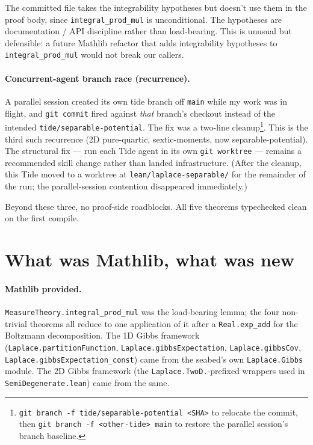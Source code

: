 \documentclass[11pt]{article}
\begin{document}
The committed file takes the integrability hypotheses but doesn't use
them in the proof body, since \texttt{integral\_prod\_mul} is
unconditional. The hypotheses are documentation / API discipline rather
than load-bearing. This is unusual but defensible: a future Mathlib
refactor that adds integrability hypotheses to \texttt{integral\_prod\_mul}
would not break our callers.

\paragraph{Concurrent-agent branch race (recurrence).}
A parallel session created its own tide branch off \texttt{main}
while my work was in flight, and \texttt{git commit} fired against
\emph{that} branch's checkout instead of the intended
\texttt{tide/separable-potential}. The fix was a two-line
cleanup\footnote{\texttt{git branch -f tide/separable-potential <SHA>}
to relocate the commit, then \texttt{git branch -f <other-tide> main}
to restore the parallel session's branch baseline.}. This is the
third such recurrence (2D pure-quartic, sextic-moments, now
separable-potential). The structural fix --- run each Tide agent in
its own \texttt{git worktree} --- remains a recommended skill change
rather than landed infrastructure. (After the cleanup, this Tide
moved to a worktree at \texttt{lean/laplace-separable/} for the
remainder of the run; the parallel-session contention disappeared
immediately.)

Beyond these three, no proof-side roadblocks. All five theorems
typechecked clean on the first compile.

\section{What was Mathlib, what was new}

\paragraph{Mathlib provided.} \texttt{MeasureTheory.integral\_prod\_mul}
was the load-bearing lemma; the four non-trivial theorems all reduce to
one application of it after a \texttt{Real.exp\_add} for the Boltzmann
decomposition. The 1D Gibbs framework
(\texttt{Laplace.partitionFunction}, \texttt{Laplace.gibbsExpectation},
\texttt{Laplace.gibbsCov}, \texttt{Laplace.gibbsExpectation\_const})
came from the seabed's own \texttt{Laplace.Gibbs} module. The 2D Gibbs
framework (the \texttt{Laplace.TwoD.}-prefixed wrappers used in
\texttt{SemiDegenerate.lean}) came from the same.
\end{document}
